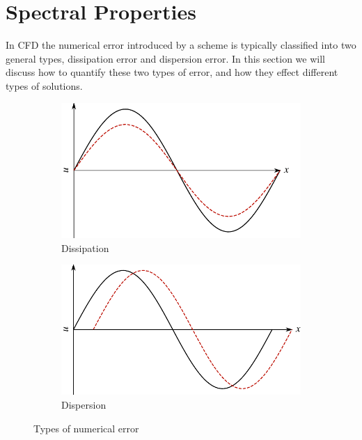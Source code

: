 \chapter{Spectral Properties}
In CFD the numerical error introduced by a scheme is typically classified into two general types, dissipation error and dispersion error. In this section we will discuss how to quantify these two types of error, and how they effect different types of solutions.

\begin{figure}[htbp]
	\centering
	\begin{subfigure}[b]{0.49\linewidth}
		\includegraphics[width=\linewidth]{Pictures/dissipation_diagram}
		\caption{Dissipation}
	\end{subfigure}
	\begin{subfigure}[b]{0.49\linewidth}
		\includegraphics[width=\linewidth]{Pictures/dispersion_diagram}
		\caption{Dispersion}
	\end{subfigure}
	\caption{Types of numerical error}
	\label{fig:numerical_error}
\end{figure}



